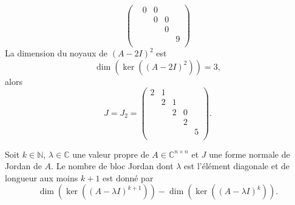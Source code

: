 \begin{example}
\begin{displaymath}
\begin{pmatrix}
    & 0 & 0 \\
    & & 0 & 0 \\
    & & & 0   \\
    & & & & 9 \\
  \end{pmatrix}
\end{displaymath}
La dimension du noyaux  de $(A - 2I)^2$  est
\begin{displaymath}
\dim(  \ker((A - 2I)^2) ) = 3,
\end{displaymath}
alors
\begin{displaymath}
  J = J_2 =  \begin{pmatrix}
    2 & 1  \\
    & 2 & 1 \\
    & & 2 & 0 \\
    & & & 2   \\
    & & & & 5 \\
  \end{pmatrix}. 
\end{displaymath}
\end{example}


\begin{lemma}
  \label{lem:30}
  Soit $k ∈ ℕ$, $λ∈ ℂ$ une valeur propre de $A ∈ℂ^{n×n}$ et $J$ une forme normale de Jordan de $A$.   Le nombre de bloc Jordan dont $λ$ est l'élément diagonale et de longueur aux moins $k+1$   est donné par
  \begin{displaymath}
    \dim(\ker\left((A - λI)^{k+1}\right)) -\dim(\ker\left((A - λI)^{k}\right)). 
  \end{displaymath}
\end{lemma}

